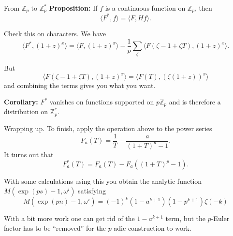 \documentclass[
  ignorenonframetext,
]{beamer}
\begin{document}
\begin{frame}{From \(\mathbb{Z}_p\) to \(\mathbb{Z}_p^{*}\)}
\protect\hypertarget{from-mathbbz_p-to-mathbbz_p-1}{}
\textbf{Proposition:} If \(f\) is a continuous function on
\(\mathbb{Z}_p\), then \[
\langle F^{*}, f\rangle = \langle F, Hf\rangle.
\]

Check this on characters. We have \[
\langle F^{*}, (1+z)^x\rangle = \langle F,(1+z)^x\rangle -\frac{1}{p}\sum_{\zeta}\langle F(\zeta-1+\zeta T),(1+z)^x\rangle.
\]

But \[
\langle F(\zeta-1+\zeta T),(1+z)^x\rangle=\langle F(T),(\zeta (1+z))^x\rangle
\] and combining the terms gives you what you want.

\textbf{Corollary:} \(F^{*}\) vanishes on functions supported on
\(p\mathbb{Z}_p\) and is therefore a distribution on
\(\mathbb{Z}_p^{*}\).
\end{frame}

\begin{frame}{Wrapping up.}
\protect\hypertarget{wrapping-up.}{}
To finish, apply the operation above to the power series \[
F_{a}(T)=\frac{1}{T}-\frac{a}{(1+T)^a-1}.
\] It turns out that \[
F_a^{*}(T) = F_{a}(T) - F_{a}((1+T)^{p}-1).
\]

With some calculations using this you obtain the analytic function
\(M(\exp(ps)-1,\omega^{i})\) satisfying \[
M(\exp(pn)-1,\omega^{i})= (-1)^{k}(1-a^{k+1})(1-p^{k+1})\zeta(-k)
\]

With a bit more work one can get rid of the \(1-a^{k+1}\) term, but the
\(p\)-Euler factor has to be ``removed'' for the \(p\)-adic construction
to work.
\end{frame}
\end{document}

